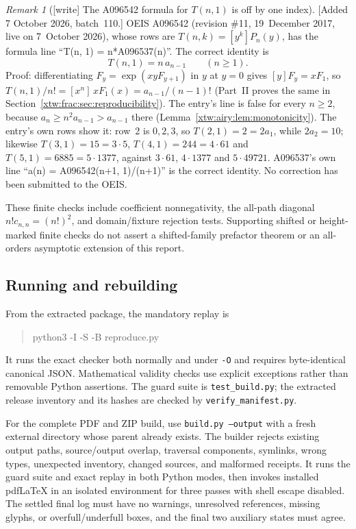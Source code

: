 \documentclass[11pt]{article}
\theoremstyle{remark}\newtheorem{remark}[theorem]{Remark}
\begin{document}
\begin{remark}[\textsf{[write]} The A096542 formula for $T(n,1)$ is off by one index]\label{xtw:airy:rem:oeis542}
[Added 7 October 2026, batch~110.] OEIS A096542 (revision \#11,
19~December 2017, live on 7~October 2026), whose rows are $T(n,k)=[y^k]P_n(y)$,
has the formula line ``T(n, 1) = n*A096537(n)''. The correct identity is
\[
 T(n,1)=n\,a_{n-1}\qquad(n\ge1).
\]
Proof: differentiating $F_y=\exp(xyF_{y+1})$ in $y$ at $y=0$ gives
$[y]F_y=xF_1$, so $T(n,1)/n!=[x^n]\,xF_1(x)=a_{n-1}/(n-1)!$ (Part~II proves the
same in Section~\ref{xtw:frac:sec:reproducibility}). The entry's line is false
for every $n\ge2$, because $a_n\ge n^2a_{n-1}>a_{n-1}$ there
(Lemma~\ref{xtw:airy:lem:monotonicity}). The entry's own rows show it: row~2
is $0,2,3$, so $T(2,1)=2=2a_1$, while $2a_2=10$; likewise $T(3,1)=15=3\cdot5$,
$T(4,1)=244=4\cdot61$ and $T(5,1)=6885=5\cdot1377$, against $3\cdot61$,
$4\cdot1377$ and $5\cdot49721$. A096537's own line ``a(n) = A096542(n+1,
1)/(n+1)'' is the correct identity. No correction has been submitted to the
OEIS.
\end{remark}

These finite checks include coefficient nonnegativity, the all-path diagonal
$n!c_{n,n}=(n!)^2$, and domain/fixture rejection tests. Supporting shifted or
height-marked finite checks do not assert a shifted-family prefactor theorem
or an all-orders asymptotic extension of this report.

\subsection{Running and rebuilding}
From the extracted package, the mandatory replay is
\begin{quote}\ttfamily
 python3 -I -S -B reproduce.py
\end{quote}
It runs the exact checker both normally and under \texttt{-O} and requires
byte-identical canonical JSON. Mathematical validity checks use explicit
exceptions rather than removable Python assertions. The guard suite is
\texttt{test\_build.py}; the extracted release inventory and its hashes are
checked by \texttt{verify\_manifest.py}.

For the complete PDF and ZIP build, use \texttt{build.py --output} with a
fresh external directory whose parent already exists. The builder rejects
existing output paths, source/output overlap, traversal components, symlinks,
wrong types, unexpected inventory, changed sources, and malformed receipts.
It runs the guard suite and exact replay in both Python modes, then invokes
installed pdfLaTeX in an isolated environment for three passes with shell
escape disabled. The settled final log must have no warnings, unresolved
references, missing glyphs, or overfull/underfull boxes, and the final two
auxiliary states must agree.
\end{document}
